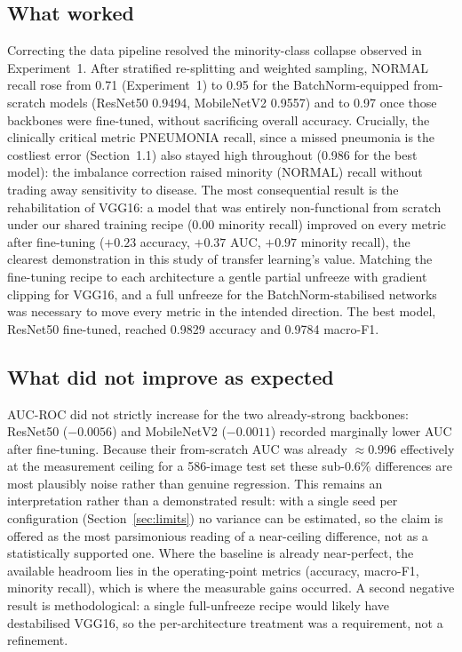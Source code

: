 \documentclass[11pt,a4paper]{article}
\numberwithin{figure}{section}
\numberwithin{table}{section}
\begin{document}
\subsection{What worked}
Correcting the data pipeline resolved the minority-class collapse observed in Experiment~1. After
stratified re-splitting and weighted sampling, NORMAL recall rose from 0.71 (Experiment~1) to 0.95 for
the BatchNorm-equipped from-scratch models (ResNet50 0.9494, MobileNetV2 0.9557) and to 0.97 once those
backbones were fine-tuned, without sacrificing overall accuracy. Crucially, the clinically critical
metric PNEUMONIA recall, since a missed pneumonia is the costliest error (Section~1.1) also stayed
high throughout (0.986 for the best model): the imbalance correction raised minority (NORMAL) recall
without trading away sensitivity to disease. The most consequential result is the rehabilitation of
VGG16: a model that was entirely non-functional from scratch under our shared training recipe (0.00
minority recall) improved on every metric after fine-tuning ($+0.23$ accuracy, $+0.37$ AUC, $+0.97$
minority recall), the clearest demonstration in this study of transfer learning's value. Matching the
fine-tuning recipe to each architecture a gentle partial unfreeze with gradient clipping for VGG16, and
a full unfreeze for the BatchNorm-stabilised networks was necessary to move every metric in the
intended direction. The best model, ResNet50 fine-tuned, reached 0.9829 accuracy and 0.9784 macro-F1.

\subsection{What did not improve as expected}
AUC-ROC did not strictly increase for the two already-strong backbones: ResNet50 ($-0.0056$) and
MobileNetV2 ($-0.0011$) recorded marginally lower AUC after fine-tuning. Because their from-scratch AUC
was already $\approx0.996$ effectively at the measurement ceiling for a 586-image test set these
sub-0.6\% differences are most plausibly noise rather than genuine regression. This remains an
interpretation rather than a demonstrated result: with a single seed per configuration
(Section~\ref{sec:limits}) no variance can be estimated, so the claim is offered as the most parsimonious
reading of a near-ceiling difference, not as a statistically supported one. Where the baseline is already
near-perfect, the available headroom lies in the operating-point metrics (accuracy, macro-F1, minority
recall), which is where the measurable gains occurred. A second negative result is methodological: a
single full-unfreeze recipe would likely have destabilised VGG16, so the per-architecture treatment was a
requirement, not a refinement.
\end{document}

